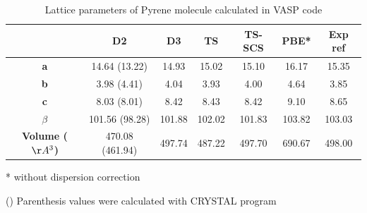  	\begin{table}[H]
 		\caption{Lattice parameters of Pyrene molecule calculated in VASP code}  \label{table-pyresol}
 		\begin{center}
 			\begin{threeparttable}
 			\begin{tabular}{c c c c c c c}
 				\toprule
 				& \textbf{D2} & \textbf{D3} & \textbf{TS} & \textbf{TS-SCS} & \textbf{PBE*} & \textbf{Exp} ref\cite{fabbiani2006exploration} \\
 				\midrule
 				\textbf{a} & 14.64 (13.22) & 14.93 & 15.02 & 15.10 & 16.17 & 15.35\\
 				\textbf{b}& 3.98 (4.41) & 4.04 & 3.93 & 4.00 & 4.64 & 3.85\\
 				\textbf{c}& 8.03 (8.01) & 8.42 & 8.43 & 8.42 & 9.10 & 8.65\\
 				\textbf{$\beta$} & 101.56 (98.28) & 101.88 & 102.02 & 101.83 & 103.82 & 103.03\\
 				\textbf{Volume ($\AA^{3}$)}& 470.08 (461.94) & 497.74 & 487.22 & 497.70 & 690.67 & 498.00\\
 				\bottomrule
 			\end{tabular}
 			
 			\begin{tablenotes}
 				\item[*] without dispersion correction
 				\item[()] Parenthesis values were calculated with CRYSTAL program
 			\end{tablenotes}
 		\end{threeparttable}
 		\end{center}
 	\end{table}
 	
